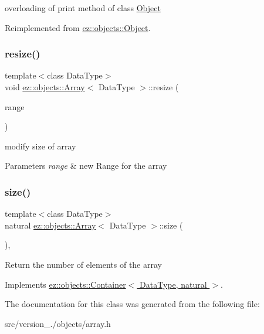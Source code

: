 overloading of print method of class \hyperlink{classez_1_1objects_1_1Object}{Object} 

Reimplemented from \hyperlink{classez_1_1objects_1_1Object_a9e20f39a78163f67f000576149d858b3}{ez\+::objects\+::\+Object}.

\mbox{\label{classez_1_1objects_1_1Array_acdd164cad40bed068075550d943d19c2}} 
\subsubsection{\texorpdfstring{resize()}{resize()}}
{\footnotesize\ttfamily template$<$class Data\+Type$>$ \\
void \hyperlink{classez_1_1objects_1_1Array}{ez\+::objects\+::\+Array}$<$ Data\+Type $>$\+::resize (\begin{DoxyParamCaption}\item[{\hyperlink{classez_1_1essential_1_1Range}{Range}}]{range }\end{DoxyParamCaption})\hspace{0.3cm}{\ttfamily [inline]}}

modify size of array 
\begin{DoxyParams}{Parameters}
{\em range} & new Range for the array \\
\hline
\end{DoxyParams}
\mbox{\label{classez_1_1objects_1_1Array_af3ac644ccc4058fb2e13797af274a3de}} 
\subsubsection{\texorpdfstring{size()}{size()}}
{\footnotesize\ttfamily template$<$class Data\+Type$>$ \\
natural \hyperlink{classez_1_1objects_1_1Array}{ez\+::objects\+::\+Array}$<$ Data\+Type $>$\+::size (\begin{DoxyParamCaption}{ }\end{DoxyParamCaption})\hspace{0.3cm}{\ttfamily [inline]}, {\ttfamily [virtual]}}

Return the number of elements of the array 

Implements \hyperlink{classez_1_1objects_1_1Container_affd294810c6c29530d1d1e3c2151ad28}{ez\+::objects\+::\+Container$<$ Data\+Type, natural $>$}.



The documentation for this class was generated from the following file\+:\begin{DoxyCompactItemize}
\item 
src/version\+\_./objects/array.\+h\end{DoxyCompactItemize}
